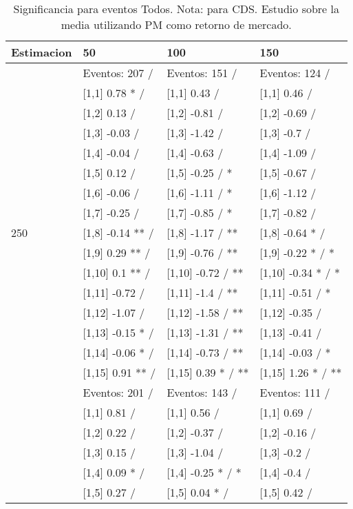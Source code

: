 \begin{table}

\caption{Significancia para eventos Todos. Nota: para CDS. Estudio sobre la media utilizando PM como retorno de mercado.}
\centering
\begin{tabular}[t]{llll}
\toprule
Estimacion & 50 & 100 & 150\\
\midrule
 & Eventos:  207 / & Eventos:  151 / & Eventos:  124 /\\
 & {}[1,1] 0.78 * / & {}[1,1] 0.43  / & {}[1,1] 0.46  /\\
 & {}[1,2] 0.13  / & {}[1,2] -0.81  / & {}[1,2] -0.69  /\\
 & {}[1,3] -0.03  / & {}[1,3] -1.42  / & {}[1,3] -0.7  /\\
 & {}[1,4] -0.04  / & {}[1,4] -0.63  / & {}[1,4] -1.09  /\\
\addlinespace
 & {}[1,5] 0.12  / & {}[1,5] -0.25  / * & {}[1,5] -0.67  /\\
 & {}[1,6] -0.06  / & {}[1,6] -1.11  / * & {}[1,6] -1.12  /\\
 & {}[1,7] -0.25  / & {}[1,7] -0.85  / * & {}[1,7] -0.82  /\\
250 & {}[1,8] -0.14 ** / & {}[1,8] -1.17  / ** & {}[1,8] -0.64 * /\\
 & {}[1,9] 0.29 ** / & {}[1,9] -0.76  / ** & {}[1,9] -0.22 * / *\\
\addlinespace
 & {}[1,10] 0.1 ** / & {}[1,10] -0.72  / ** & {}[1,10] -0.34 * / *\\
 & {}[1,11] -0.72  / & {}[1,11] -1.4  / ** & {}[1,11] -0.51  / *\\
 & {}[1,12] -1.07  / & {}[1,12] -1.58  / ** & {}[1,12] -0.35  /\\
 & {}[1,13] -0.15 * / & {}[1,13] -1.31  / ** & {}[1,13] -0.41  /\\
 & {}[1,14] -0.06 * / & {}[1,14] -0.73  / ** & {}[1,14] -0.03  / *\\
\addlinespace
 & {}[1,15] 0.91 ** / & {}[1,15] 0.39 * / ** & {}[1,15] 1.26 * / **\\
 & Eventos:  201 / & Eventos:  143 / & Eventos:  111 /\\
 & {}[1,1] 0.81  / & {}[1,1] 0.56  / & {}[1,1] 0.69  /\\
 & {}[1,2] 0.22  / & {}[1,2] -0.37  / & {}[1,2] -0.16  /\\
 & {}[1,3] 0.15  / & {}[1,3] -1.04  / & {}[1,3] -0.2  /\\
\addlinespace
 & {}[1,4] 0.09 * / & {}[1,4] -0.25 * / * & {}[1,4] -0.4  /\\
 & {}[1,5] 0.27  / & {}[1,5] 0.04 * / & {}[1,5] 0.42  /\\

\end{tabular}
\end{table}
